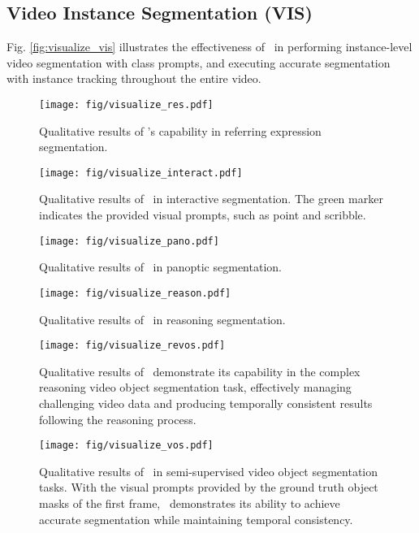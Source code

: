 \subsection{Video Instance Segmentation (VIS)}
Fig. \ref{fig:visualize_vis} illustrates the effectiveness of \name~in performing instance-level video segmentation with class prompts, and executing accurate segmentation with instance tracking throughout the entire video.

\begin{figure*}[t]
    \centering
    \texttt{[image: fig/visualize\_res.pdf]}
    \caption{Qualitative results of \name’s capability in referring expression segmentation. 
    }
    \label{fig:visualize_res}
\end{figure*}

\begin{figure*}[t]
    \centering
    \texttt{[image: fig/visualize\_interact.pdf]}
    \caption{Qualitative results of \name~in interactive segmentation. The green marker indicates the provided visual prompts, such as point and scribble.
    }
    \label{fig:visualize_interact}
\end{figure*}

\begin{figure*}[t]
    \centering
    \texttt{[image: fig/visualize\_pano.pdf]}
    \caption{Qualitative results of \name~in panoptic segmentation.
    }
    \label{fig:visualize_pano}
\end{figure*}

\begin{figure*}[t]
    \centering
    \texttt{[image: fig/visualize\_reason.pdf]}
    \caption{Qualitative results of \name~in 
    reasoning segmentation.
    }
    \label{fig:visualize_reason}
\end{figure*}

\begin{figure*}[t]
    \centering
    \texttt{[image: fig/visualize\_revos.pdf]}
    \caption{Qualitative results of \name~demonstrate its capability in the complex reasoning video object segmentation task, effectively managing challenging video data and producing temporally consistent results following the reasoning process.
    }
    \label{fig:visualize_revos}
\end{figure*}

\begin{figure*}[t]
    \centering
    \texttt{[image: fig/visualize\_vos.pdf]}
    \caption{Qualitative results of \name~in semi-supervised video object segmentation tasks. With the visual prompts provided by the ground truth object masks of the first frame, \name~demonstrates its ability to achieve accurate segmentation while maintaining temporal consistency.
    }
    \label{fig:visualize_vos}
\end{figure*}

